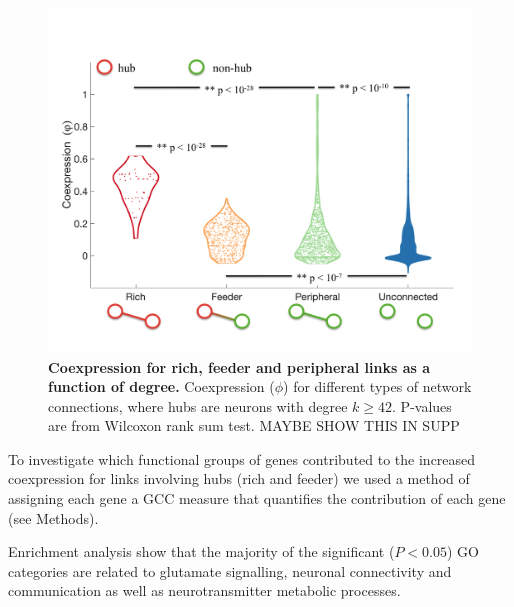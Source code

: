 \documentclass[10pt,letterpaper]{article}
\begin{document}
\begin{figure}[!h]
 \centering
    \includegraphics[width=1\textwidth]{RichFeederPeripheral_k42FINAL}
 \caption{{\bf Coexpression for rich, feeder and peripheral links as a function of degree.}
Coexpression ($\phi$) for different types of network connections, where hubs are neurons with degree $k \geq 42$. P-values are from Wilcoxon rank sum test. MAYBE SHOW THIS IN SUPP}
 \label{ViolinPlots}
 \end{figure}

To investigate which functional groups of genes contributed to the increased coexpression for links involving hubs (rich and feeder) we used a method of assigning each gene a GCC measure that quantifies the contribution of each gene (see Methods).

Enrichment analysis show that the majority of the significant ($P < 0.05$) GO categories are related to glutamate signalling, neuronal connectivity and communication as well as neurotransmitter metabolic processes.  
\end{document}
